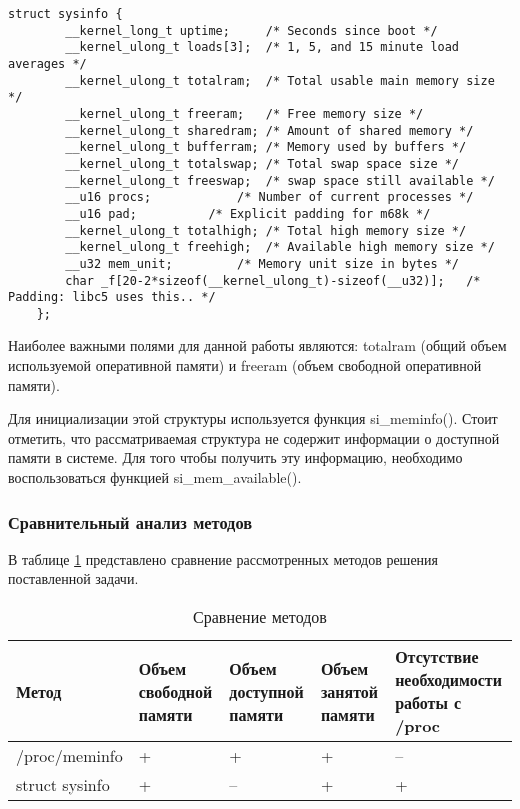 \begin{lstlisting}[label={lst:sysinfo}, caption={структура struct sysinfo}]
	struct sysinfo {
		__kernel_long_t uptime;		/* Seconds since boot */
		__kernel_ulong_t loads[3];	/* 1, 5, and 15 minute load averages */
		__kernel_ulong_t totalram;	/* Total usable main memory size */
		__kernel_ulong_t freeram;	/* Free memory size */
		__kernel_ulong_t sharedram;	/* Amount of shared memory */
		__kernel_ulong_t bufferram;	/* Memory used by buffers */
		__kernel_ulong_t totalswap;	/* Total swap space size */
		__kernel_ulong_t freeswap;	/* swap space still available */
		__u16 procs;		   	/* Number of current processes */
		__u16 pad;		   	/* Explicit padding for m68k */
		__kernel_ulong_t totalhigh;	/* Total high memory size */
		__kernel_ulong_t freehigh;	/* Available high memory size */
		__u32 mem_unit;			/* Memory unit size in bytes */
		char _f[20-2*sizeof(__kernel_ulong_t)-sizeof(__u32)];	/* Padding: libc5 uses this.. */
	};
\end{lstlisting}

Наиболее важными полями для данной работы являются: totalram (общий объем используемой оперативной памяти) и freeram (объем свободной оперативной памяти).

Для инициализации этой структуры используется функция si\_meminfo(). Стоит отметить, что рассматриваемая структура не содержит информации о доступной памяти в системе. Для того чтобы получить эту информацию, необходимо воспользоваться функцией si\_mem\_available().

\subsubsection{Сравнительный анализ методов}

В таблице \ref{tab:compare} представлено сравнение рассмотренных методов решения поставленной задачи.

\begin{table}[!h]
	\captionsetup{justification=centering}
	\caption{\label{tab:compare} Сравнение методов}
	\begin{center}
		\begin{tabular}{|p{}|p{}|p{}|p{}|p{}|}
			\hline
			\textbf{Метод} & \textbf{Объем свободной памяти} & \textbf{Объем доступной памяти} & \textbf{Объем занятой памяти} & \textbf{Отсутствие необходимости работы с /proc}\\
			\hline
			/proc/meminfo & + & + & + & -- \\
			\hline
			struct sysinfo & + & -- & + & + \\
			\hline
		\end{tabular}
	\end{center}
\end{table}

